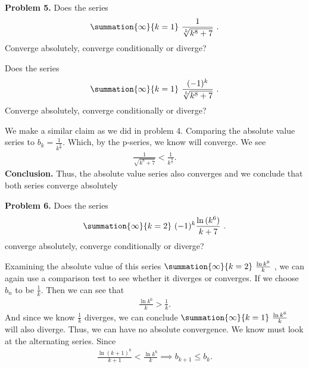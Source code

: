 \documentclass{report}
\begin{document}
    \pagebreak
    \begin{mdframed}
        \textbf{Problem 5.} Does the series 
        \begin{align*}
            \summation{\infty}{k=1}\ \frac{1}{\sqrt[5]{k^{8} + 7}}\ 
        .\end{align*}
        Converge absolutely, converge conditionally or diverge?

        \bigbreak \noindent 
        Does the series 
        \begin{align*}
            \summation{\infty}{k=1}\ \frac{(-1)^{k}}{\sqrt[5]{k^{8}+7}}\ 
        .\end{align*}
        Converge absolutely, converge conditionally or diverge?
    \end{mdframed}
    \bigbreak \noindent 
    We make a similar claim as we did in problem 4. Comparing the absolute value series to $b_{k} = \frac{1}{k^{\frac{8}{5}}}$. Which, by the p-series, we know will converge. We see
    \begin{align*}
        \frac{1}{\sqrt{k^{8}+7}} < \frac{1}{k^{\frac{8}{5}}}
    .\end{align*}
    \bigbreak \noindent 
    \textbf{Conclusion.} Thus, the absolute value series also converges and we conclude that both series converge absolutely
    \pagebreak
    \begin{mdframed}
        \textbf{Problem 6.} Does the series 
        \begin{align*}
            \summation{\infty}{k=2}\ (-1)^{k} \frac{\ln{(k^{6})}}{k+7}\ 
        .\end{align*}
         converge absolutely, converge conditionally or diverge?
    \end{mdframed}
    \bigbreak \noindent 
    Examining the absolute value of this series $\summation{\infty}{k=2}\ \frac{\ln{k^{6}}}{k}\  $, we can again use a comparison test to see whether it diverges or converges. If we choose $b_{n}$ to be $\frac{1}{k}$. Then we can see that 
    \begin{align*}
        \frac{\ln{k^{6}}}{k} > \frac{1}{k}
    .\end{align*}
    \bigbreak \noindent 
    And since we know $\frac{1}{k}$ diverges, we can conclude $\summation{\infty}{k=1}\ \frac{\ln{k^{6}}}{k}\  $ will also diverge. Thus, we can have no absolute convergence.
    \bigbreak \noindent 
    We know must look at the alternating series. Since
    \begin{align*}
        \frac{\ln{(k+1)^{6}}}{k+1} < \frac{\ln{k^{6}}}{k} \implies b_{k +1} \leq b_{k}
    .\end{align*}
\end{document}
